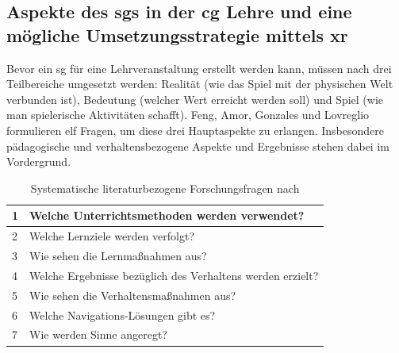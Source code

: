 \documentclass[conference]{IEEEtran}
\begin{document}
\subsection{Aspekte des \gls{sg}s in der \gls{cg} Lehre und eine mögliche Umsetzungsstrategie mittels \gls{xr}}

Bevor ein \gls{sg} für eine Lehrveranstaltung erstellt werden kann, müssen nach\cite{a14} drei Teilbereiche umgesetzt werden:
Realität (wie das Spiel mit der physischen Welt verbunden ist), Bedeutung (welcher Wert erreicht werden soll)
und Spiel (wie man spielerische Aktivitäten schafft)\cite{a14}.
Feng, Amor, Gonzales und Lovreglio\cite{a15} formulieren elf Fragen, um diese drei Hauptaspekte zu erlangen.
Insbesondere pädagogische und verhaltensbezogene Aspekte und Ergebnisse stehen dabei im Vordergrund.

\begin{table}[]
\caption{Systematische literaturbezogene Forschungsfragen nach\cite{a14}}
\begin{tabular}{|l|l|}
\hline
1  & Welche Unterrichtsmethoden werden verwendet?                                                                                                                           \\ \hline
2  & Welche Lernziele werden verfolgt?                                                                                                                                      \\ \hline
3  & Wie sehen die Lernmaßnahmen aus?                                                                                                                                       \\ \hline
4  & Welche Ergebnisse bezüglich des Verhaltens werden erzielt?                                                                                                                                \\ \hline
5  & Wie sehen die Verhaltensmaßnahmen aus?                                                                                                                                      \\ \hline
6  & Welche Navigations-Lösungen gibt es?                                                                                                                                   \\ \hline
7  & Wie werden Sinne angeregt?                                                                                                                                             \\ \hline

\end{tabular}
\end{table}
\end{document}
